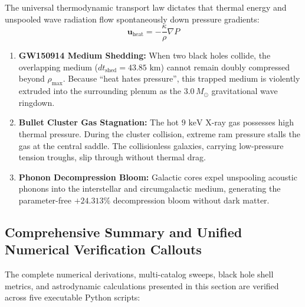 \documentclass[11pt,a4paper]{article}
\begin{document}
The universal thermodynamic transport law dictates that thermal energy and unspooled wave radiation flow spontaneously down pressure gradients:
\begin{equation}
\mathbf{u}_{\text{heat}} = -\frac{\kappa}{\rho} \nabla P
\label{eq:heat_hates_pressure_sec5}
\end{equation}

\begin{enumerate}
    \item \textbf{GW150914 Medium Shedding:} When two black holes collide, the overlapping medium ($dt_{\text{shed}} = 43.85\text{ km}$) cannot remain doubly compressed beyond $\rho_{\max}$. Because ``heat hates pressure'', this trapped medium is violently extruded into the surrounding plenum as the $3.0\,M_\odot$ gravitational wave ringdown.
    \item \textbf{Bullet Cluster Gas Stagnation:} The hot $9\text{ keV}$ X-ray gas possesses high thermal pressure. During the cluster collision, extreme ram pressure stalls the gas at the central saddle. The collisionless galaxies, carrying low-pressure tension troughs, slip through without thermal drag.
    \item \textbf{Phonon Decompression Bloom:} Galactic cores expel unspooling acoustic phonons into the interstellar and circumgalactic medium, generating the parameter-free $+24.313\%$ decompression bloom without dark matter.
\end{enumerate}

\subsection{Comprehensive Summary and Unified Numerical Verification Callouts}
\label{subsec:section5_verification}

The complete numerical derivations, multi-catalog sweeps, black hole shell metrics, and astrodynamic calculations presented in this section are verified across five executable Python scripts:
\end{document}
